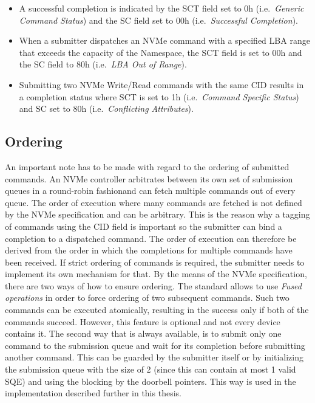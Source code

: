 \begin{itemize}
    \item A successful completion is indicated by the SCT field set to 0h (i.e.\ \emph{Generic
        Command Status}) and the SC field set to 00h (i.e.\ \emph{Successful Completion}).
    \item When a submitter dispatches an NVMe command with a specified LBA range that exceeds the
        capacity of the Namespace, the SCT field is set to 00h and the SC field to 80h (i.e.\
        \emph{LBA Out of Range}).
    \item Submitting two NVMe Write/Read commands with the same \ac{CID} results in a completion
        status where SCT is set to 1h (i.e.\ \emph{Command Specific Status}) and SC set to 80h
        (i.e.\ \emph{Conflicting Attributes}).
\end{itemize}

\subsection{Ordering}

An important note has to be made with regard to the ordering of submitted commands. An NVMe
controller arbitrates between its own set of submission queues in a round-robin
fashion\footnotemark\@ and can fetch multiple commands out of every queue. The order of execution
where many commands are fetched is not defined by the NVMe specification and can be arbitrary. This
is the reason why a tagging of commands using the \ac{CID} field is important so the submitter can
bind a completion to a dispatched command\cite{nvme_spec}. The order of execution can therefore be
derived from the order in which the completions for multiple commands have been received. If strict
ordering of commands is required, the submitter needs to implement its own mechanism for that.
By the means of the NVMe specification, there are two ways of how to ensure ordering. The
standard allows to use \emph{Fused operations} in order to force ordering of two subsequent
commands. Such two commands can be executed atomically, resulting in the success only if both of the
commands succeed. However, this feature is optional and not every device contains
it\cite{nvme_spec}. The second way that is always available, is to submit only one command to the
submission queue and wait for its completion before submitting another command. This can be guarded
by the submitter itself or by initializing the submission queue with the size of 2 (since this can
contain at most 1 valid SQE) and using the blocking by the doorbell pointers. This way is used in
the implementation described further in this thesis.

